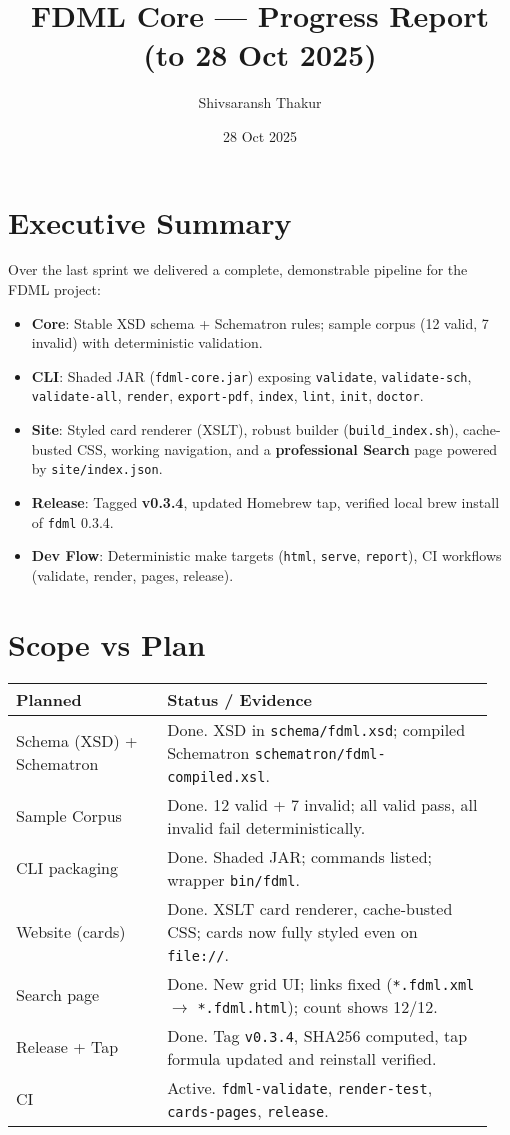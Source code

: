 \documentclass[11pt,a4paper]{article}
\title{\textbf{FDML Core — Progress Report (to 28 Oct 2025)}}
\author{Shivsaransh Thakur}
\date{28 Oct 2025}
\newcommand{\code}[1]{\texttt{#1}}
\begin{document}
\maketitle

\section{Executive Summary}
Over the last sprint we delivered a complete, demonstrable pipeline for the FDML project:
\begin{itemize}[leftmargin=1.2em]
  \item \textbf{Core}: Stable XSD schema + Schematron rules; sample corpus (12 valid, 7 invalid) with deterministic validation.
  \item \textbf{CLI}: Shaded JAR (\code{fdml-core.jar}) exposing \code{validate}, \code{validate-sch}, \code{validate-all}, \code{render}, \code{export-pdf}, \code{index}, \code{lint}, \code{init}, \code{doctor}.
  \item \textbf{Site}: Styled card renderer (XSLT), robust builder (\code{build\_index.sh}), cache-busted CSS, working navigation, and a \textbf{professional Search} page powered by \code{site/index.json}.
  \item \textbf{Release}: Tagged \textbf{v0.3.4}, updated Homebrew tap, verified local brew install of \code{fdml} 0.3.4.
  \item \textbf{Dev Flow}: Deterministic make targets (\code{html}, \code{serve}, \code{report}), CI workflows (validate, render, pages, release).
\end{itemize}

\section{Scope vs Plan}
\begin{longtable}{p{0.30\linewidth} p{0.65\linewidth}}
\textbf{Planned} & \textbf{Status / Evidence}\\\hline
Schema (XSD) + Schematron & Done. XSD in \code{schema/fdml.xsd}; compiled Schematron \code{schematron/fdml-compiled.xsl}.\\
Sample Corpus & Done. 12 valid + 7 invalid; all valid pass, all invalid fail deterministically.\\
CLI packaging & Done. Shaded JAR; commands listed; wrapper \code{bin/fdml}.\\
Website (cards) & Done. XSLT card renderer, cache-busted CSS; cards now fully styled even on \code{file://}.\\
Search page & Done. New grid UI; links fixed (\code{*.fdml.xml} $\rightarrow$ \code{*.fdml.html}); count shows 12/12.\\
Release + Tap & Done. Tag \code{v0.3.4}, SHA256 computed, tap formula updated and reinstall verified.\\
CI & Active. \code{fdml-validate}, \code{render-test}, \code{cards-pages}, \code{release}.\\
\end{longtable}
\end{document}
